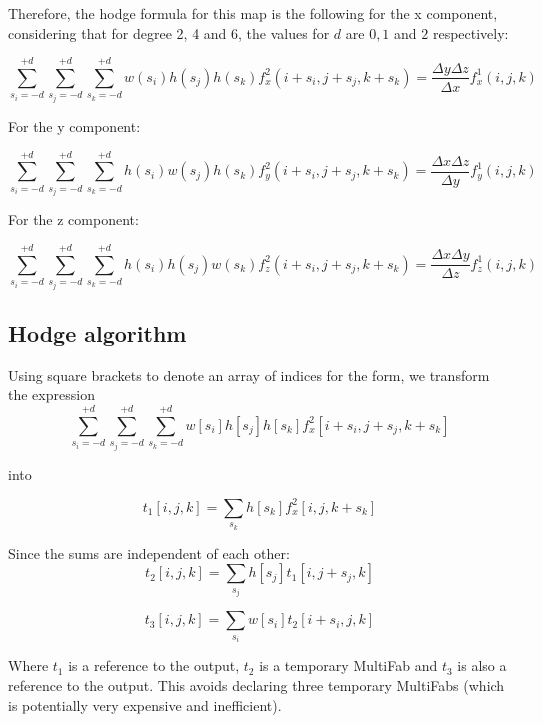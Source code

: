 \documentclass[11pt]{article}
\begin{document}
Therefore, the hodge formula for this map is the following for the x component, considering that for degree 2, 4 and 6, the values for $d$ are $0, 1$ and $2$ respectively:

\begin{equation}
    \sum_{s_i = -d} ^ {+d} \sum_{s_j = -d} ^ {+d} \sum_{s_k = -d} ^ {+d} w(s_i)h(s_j)h(s_k) f_{x}^2 (i + s_i, j + s_j, k + s_k) = \frac{\Delta y \Delta z}{\Delta x} f_{x}^1 (i, j, k)
\end{equation}

For the y component:

\begin{equation}
    \sum_{s_i = -d} ^ {+d} \sum_{s_j = -d} ^ {+d} \sum_{s_k = -d} ^ {+d} h(s_i)w(s_j)h(s_k) f_{y}^2 (i + s_i, j + s_j, k + s_k) = \frac{\Delta x \Delta z}{\Delta y} f_{y}^1 (i, j, k)
\end{equation}

For the z component:

\begin{equation}
    \sum_{s_i = -d} ^ {+d} \sum_{s_j = -d} ^ {+d} \sum_{s_k = -d} ^ {+d} h(s_i)h(s_j)w(s_k) f_{z}^2 (i + s_i, j + s_j, k + s_k) = \frac{\Delta x \Delta y}{\Delta z} f_{z}^1 (i, j, k)
\end{equation}

\subsection{Hodge algorithm}

Using square brackets to denote an array of indices for the form, we transform the expression 
\begin{equation}
    \sum_{s_i = -d} ^ {+d} \sum_{s_j = -d} ^ {+d} \sum_{s_k = -d} ^ {+d} w[s_i]h[s_j]h[s_k] f_{x}^2 [i + s_i, j + s_j, k + s_k]
\end{equation}

into

\begin{equation}
    t_1 [i,j,k] = \sum_{s_k} h[s_k] f_x ^ 2[i, j, k + s_k]
\end{equation}

Since the sums are independent of each other:
\begin{equation}
    t_2 [i,j,k] = \sum_{s_j} h[s_j] t_1[i, j + s_j, k]
\end{equation}

\begin{equation}
    t_3 [i,j,k] = \sum_{s_i} w[s_i] t_2[i + s_i, j, k]
\end{equation}

Where $t_1$ is a reference to the output, $t_2$ is a temporary MultiFab and $t_3$ is also a reference to the output. This avoids declaring three temporary MultiFabs (which is potentially very expensive and inefficient).
\end{document}

